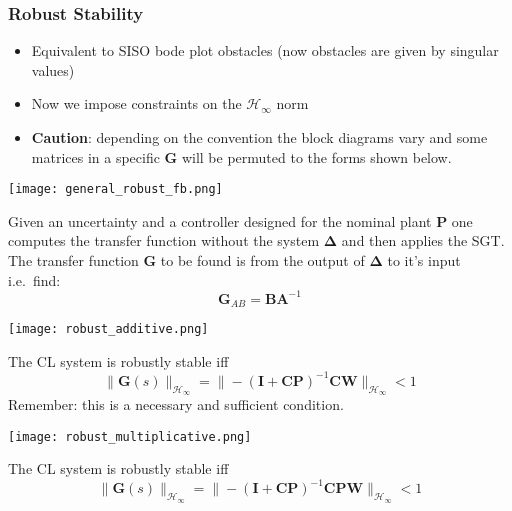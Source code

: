 \subsubsection{Robust Stability}
\begin{itemize}
    \item Equivalent to SISO bode plot obstacles (now obstacles are given by singular values)
    \item Now we impose constraints on the $\mathcal{H}_{\infty}$ norm
    \item \textbf{Caution}: depending on the convention the block diagrams vary and some matrices in a specific $\mathbf{G}$ will be permuted to the forms shown below.
\end{itemize}


\begin{center}
    \texttt{[image: general\_robust\_fb.png]}
\end{center}
Given an uncertainty and a controller designed for the nominal plant $\mathbf{P}$ one computes the transfer function without the system $\boldsymbol{\Delta}$ and then applies the SGT. The transfer function $\mathbf{G}$ to be found is from the output of $\boldsymbol{\Delta}$ to it's input i.e.\ find:
\begin{equation*}
    \mathbf{G}_{AB}=\mathbf{BA}^{-1}
\end{equation*}

\begin{center}
    \texttt{[image: robust\_additive.png]}
\end{center}
The CL system is robustly stable iff
\begin{equation*}
    \|\mathbf{G}(s)\|_{\mathcal{H}_\infty}=\|-{(\mathbf{I}+\mathbf{C}\mathbf{P})}^{-1}\mathbf{C}\mathbf{W}\|_{\mathcal{H}_\infty}<1
\end{equation*}
Remember: this is a necessary and sufficient condition.

\begin{center}
    \texttt{[image: robust\_multiplicative.png]}
\end{center}
The CL system is robustly stable iff
\begin{equation*}
    \|\mathbf{G}(s)\|_{\mathcal{H}_\infty}=\|-{(\mathbf{I}+\mathbf{CP})}^{-1}\mathbf{CPW}\|_{\mathcal{H}_\infty}<1
\end{equation*}

